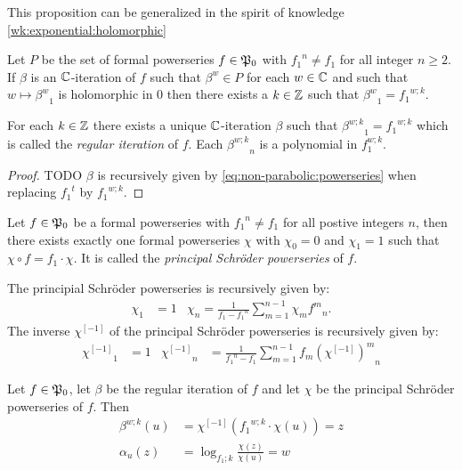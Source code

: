 \documentclass{article}
\numberwithin{equation}{section}
\begin{document}
This proposition can be generalized in the spirit of knowledge
\ref{wk:exponential:holomorphic} 
\begin{proposition}
  \label{wk:iteration:powerseries:non-parabolic:complex}
  Let $P$ be the set of formal powerseries $f\in\mathfrak{P}_0$ with
  ${f_1}^n\neq f_1$ for all integer $n\ge 2$. If
  $\beta$ is an $\mathbb{C}$-iteration of $f$ such that
  $\beta^w \in P$ for each $w\in\mathbb{C}$ and such that $w\mapsto
  {\beta^w}_1$ is holomorphic in 0 then there exists a $k\in\mathbb{Z}$ such
  that ${\beta^w}_1 = {f_1}^{w;k}$.

  For each $k\in\mathbb{Z}$ there exists a unique $\mathbb{C}$-iteration $\beta$
  such that ${\beta^{w;k}}_1={f_1}^{w;k}$ which is
  called the {\em regular iteration} of $f$. Each ${\beta^{w;k}}_n$ is a
  polynomial in $f_1^{w;k}$.
\end{proposition}
\begin{proof}
  TODO
  $\beta$ is recursively given by \eqref{eq:non-parabolic:powerseries} when
  replacing ${f_1}^t$ by ${f_1}^{w;k}$.
\end{proof}

\begin{wellknown}
  Let $f\in \mathfrak{P}_0$ be a formal powerseries with ${f_1}^n\neq f_1$
  for all postive integers $n$, then
  there exists exactly one formal powerseries $\chi$ with
  $\chi_0=0$ and $\chi_1=1$ such that $\chi\circ f = f_1\cdot\chi$. 
  It is called the {\em principal Schröder powerseries} of $f$.
\end{wellknown}
The principial Schröder powerseries is recursively given by:
\begin{align}
  \chi_1 &= 1 & \chi_n = \frac{1}{f_1-{f_1}^n}\sum_{m=1}^{n-1}
  \chi_m {f^m}_n.
\end{align}
The inverse $\chi^{[-1]}$ of the principal Schröder powerseries is recursively given by:
\begin{align}
  {\chi^{[-1]}}_1 & = 1 & {\chi^{[-1]}}_n &= \frac{1}{{f_1}^n - f_1}\sum_{m=1}^{n-1}
  f_m {\left(\chi^{[-1]}\right)^m}_n
\end{align}

\begin{wellknown}
  Let $f\in \mathfrak{P}_0$, let $\beta$ be the regular iteration of $f$
  and let $\chi$ be the principal Schröder powerseries of $f$. Then
  \begin{align}
    \beta^{w;k}(u) &= \chi^{[-1]}({f_1}^{w;k} \cdot \chi(u)) = z\\
    \alpha_u(z) &= \log_{f_1;k}\frac{\chi(z)}{\chi(u)} = w
  \end{align}
\end{wellknown}
\end{document}
